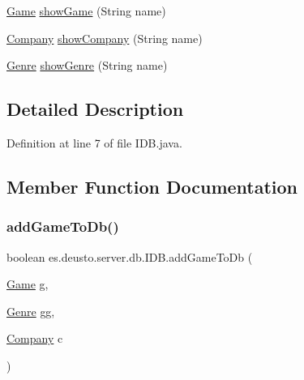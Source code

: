 \begin{DoxyCompactItemize}
\item 
\hyperlink{classes_1_1deusto_1_1server_1_1db_1_1data_1_1_game}{Game} \hyperlink{interfacees_1_1deusto_1_1server_1_1db_1_1_i_d_b_a572028cc62d36bebee977200b55eba8b}{show\+Game} (String name)
\item 
\hyperlink{classes_1_1deusto_1_1server_1_1db_1_1data_1_1_company}{Company} \hyperlink{interfacees_1_1deusto_1_1server_1_1db_1_1_i_d_b_a1681e29b5fbe4377b19e67fa939b2782}{show\+Company} (String name)
\item 
\hyperlink{classes_1_1deusto_1_1server_1_1db_1_1data_1_1_genre}{Genre} \hyperlink{interfacees_1_1deusto_1_1server_1_1db_1_1_i_d_b_a9023bdad77781d95fc2e556d1935f763}{show\+Genre} (String name)
\end{DoxyCompactItemize}


\subsection{Detailed Description}


Definition at line 7 of file I\+D\+B.\+java.



\subsection{Member Function Documentation}
\mbox{\label{interfacees_1_1deusto_1_1server_1_1db_1_1_i_d_b_a645335b2cbfa27c0199783ff2f33559e}} 
\subsubsection{\texorpdfstring{add\+Game\+To\+Db()}{addGameToDb()}}
{\footnotesize\ttfamily boolean es.\+deusto.\+server.\+db.\+I\+D\+B.\+add\+Game\+To\+Db (\begin{DoxyParamCaption}\item[{\hyperlink{classes_1_1deusto_1_1server_1_1db_1_1data_1_1_game}{Game}}]{g,  }\item[{\hyperlink{classes_1_1deusto_1_1server_1_1db_1_1data_1_1_genre}{Genre}}]{gg,  }\item[{\hyperlink{classes_1_1deusto_1_1server_1_1db_1_1data_1_1_company}{Company}}]{c }\end{DoxyParamCaption})}



